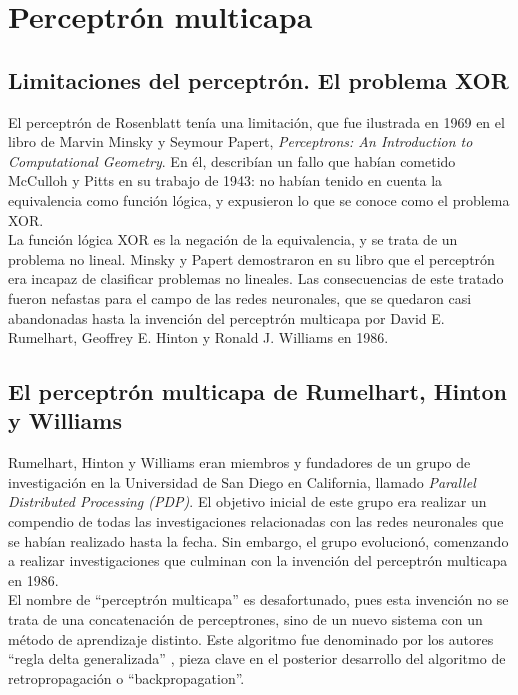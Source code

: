 \documentclass[11pt,twoside,titlepage,a4paper]{article}
\numberwithin{equation}{section} %
\theoremstyle{usual}
\begin{document}
\newpage
\section{Perceptrón multicapa}

\subsection{Limitaciones del perceptrón. El problema XOR}  
El perceptrón de Rosenblatt tenía una limitación, que fue ilustrada
en 1969 en el libro de Marvin Minsky y Seymour Papert, \textit{
Perceptrons: An Introduction to Computational Geometry}. En él,
describían un fallo que habían cometido McCulloh y Pitts en su
trabajo de 1943: no habían tenido en cuenta la equivalencia como
función lógica, y expusieron lo que se conoce como el problema XOR.
\\

La función lógica XOR es la negación de la equivalencia, y se trata
de un problema no lineal. Minsky y Papert demostraron en su libro
que el perceptrón era incapaz de clasificar problemas no lineales.
Las consecuencias de este tratado fueron nefastas para el campo
de las redes neuronales, que se quedaron casi abandonadas hasta la
invención del perceptrón multicapa por David E. Rumelhart, Geoffrey
E. Hinton y Ronald J. Williams en 1986.

\subsection{El perceptrón multicapa de Rumelhart, Hinton y Williams}

Rumelhart, Hinton y Williams eran miembros y fundadores de un grupo de
investigación en la Universidad de San Diego en California, llamado
\textit{Parallel Distributed Processing (PDP)}. El objetivo inicial de este grupo
era realizar un compendio de todas las investigaciones relacionadas con
las redes neuronales que se habían realizado hasta la fecha. Sin embargo,
el grupo evolucionó, comenzando a realizar investigaciones que culminan con
la invención del perceptrón multicapa en 1986.
\\

El nombre de ``perceptrón multicapa'' es desafortunado, pues esta
invención no se trata de una concatenación de perceptrones, sino
de un nuevo sistema con un método de aprendizaje distinto. Este algoritmo fue denominado por los autores ``regla delta generalizada'' \cite{rumelhart-hinton-williams}, pieza clave en el posterior desarrollo
del algoritmo de retropropagación o ``backpropagation''.
\\
\end{document}
